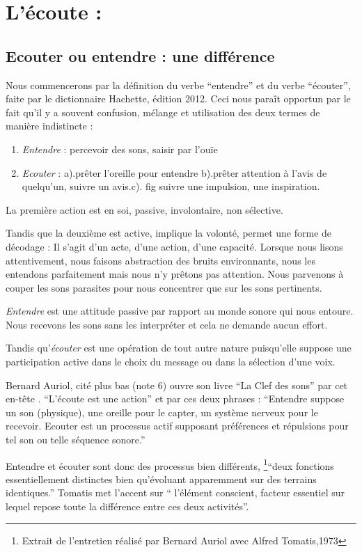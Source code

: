 \chapter{L'écoute :}

\section{Ecouter ou entendre : une différence}

Nous commencerons par la définition du verbe ``entendre'' et du
verbe ``écouter'', faite par le dictionnaire Hachette, édition 2012.
Ceci nous paraît opportun par le fait qu'il y a souvent confusion,
mélange et utilisation des deux termes de manière indistincte : 
\begin{enumerate}
\item \emph{Entendre }: percevoir des sons, saisir par l'ouïe
\item \emph{Ecouter} : a).prêter l'oreille pour entendre b).prêter attention
à l'avis de quelqu'un, suivre un avis.c). fig suivre une impulsion,
une inspiration.
\end{enumerate}
La première action est en soi, passive, involontaire, non sélective. 

Tandis que la deuxième est active, implique la volonté, permet une
forme de décodage : Il s'agit d'un acte, d'une action, d'une capacité.\emph{
}Lorsque nous lisons attentivement, nous faisons abstraction des bruits
environnants, nous les entendons parfaitement mais nous n'y prêtons
pas attention. Nous parvenons à couper les sons parasites pour nous
concentrer que sur les sons pertinents.

\emph{Entendre} est une attitude passive par rapport au monde sonore
qui nous entoure. Nous recevons les sons sans les interpréter et cela
ne demande aucun effort.

Tandis qu'\emph{écouter} est une opération de tout autre nature puisqu'elle
suppose une participation active dans le choix du message ou dans
la sélection d'une voix.

Bernard Auriol, cité plus bas (note 6) ouvre son livre ``La Clef
des sons'' par cet en-tête . ``L'écoute est une action'' et par
ces deux phrases : ``Entendre suppose un son (physique), une oreille
pour le capter, un système nerveux pour le recevoir. Ecouter est un
processus actif supposant préférences et répulsions pour tel son ou
telle séquence sonore.''

Entendre et écouter sont donc des processus bien différents, \footnote{Extrait de l'entretien réalisé par Bernard Auriol avec Alfred Tomatis,1973 }``deux
fonctions essentiellement distinctes bien qu'évoluant apparemment
sur des terrains identiques.'' Tomatis met l'accent sur `` l'élément
conscient, facteur essentiel sur lequel repose toute la différence
entre ces deux activités''.


